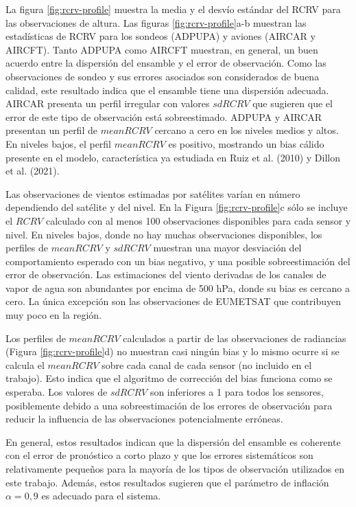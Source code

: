 \documentclass[12pt,oneside]{reedthesis}
\begin{document}
La figura \ref{fig:rcrv-profile} muestra la media y el desvío estándar del RCRV para las observaciones de altura. Las figuras \ref{fig:rcrv-profile}a-b muestran las estadísticas de RCRV para los sondeos (ADPUPA) y aviones (AIRCAR y AIRCFT). Tanto ADPUPA como AIRCFT muestran, en general, un buen acuerdo entre la dispersión del ensamble y el error de observación. Como las observaciones de sondeo y sus errores asociados son considerados de buena calidad, este resultado indica que el ensamble tiene una dispersión adecuada. AIRCAR presenta un perfil irregular con valores \(sdRCRV\) que sugieren que el error de este tipo de observación está sobreestimado. ADPUPA y AIRCAR presentan un perfil de \(meanRCRV\) cercano a cero en los niveles medios y altos. En niveles bajos, el perfil \(meanRCRV\) es positivo, mostrando un bias cálido presente en el modelo, característica ya estudiada en Ruiz et al. (2010) y Dillon et al. (2021).

Las observaciones de vientos estimadas por satélites varían en número dependiendo del satélite y del nivel. En la Figura \ref{fig:rcrv-profile}c sólo se incluye el \(RCRV\) calculado con al menos 100 observaciones disponibles para cada sensor y nivel. En niveles bajos, donde no hay muchas observaciones disponibles, los perfiles de \(meanRCRV\) y \(sdRCRV\) muestran una mayor desviación del comportamiento esperado con un bias negativo, y una posible sobreestimación del error de observación. Las estimaciones del viento derivadas de los canales de vapor de agua son abundantes por encima de 500 hPa, donde su bias es cercano a cero. La única excepción son las observaciones de EUMETSAT que contribuyen muy poco en la región.

Los perfiles de \(meanRCRV\) calculados a partir de las observaciones de radiancias (Figura \ref{fig:rcrv-profile}d) no muestran casi ningún bias y lo mismo ocurre si se calcula el \(mean RCRV\) sobre cada canal de cada sensor (no incluido en el trabajo). Esto indica que el algoritmo de corrección del bias funciona como se esperaba. Los valores de \(sd RCRV\) son inferiores a 1 para todos los sensores, posiblemente debido a una sobreestimación de los errores de observación para reducir la influencia de las observaciones potencialmente erróneas.

En general, estos resultados indican que la dispersión del ensamble es coherente con el error de pronóstico a corto plazo y que los errores sistemáticos son relativamente pequeños para la mayoría de los tipos de observación utilizados en este trabajo. Además, estos resultados sugieren que el parámetro de inflación \(\alpha = 0,9\) es adecuado para el sistema.
\end{document}
